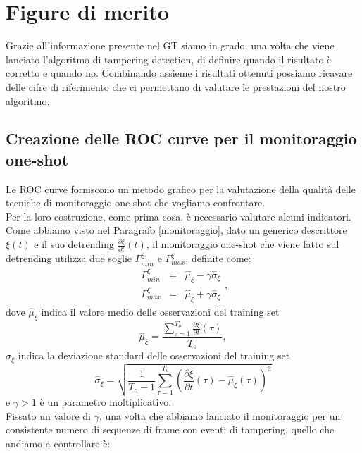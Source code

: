 \section{Figure di merito}
\label{figureDiMerito}
Grazie all'informazione presente nel GT siamo in grado, una volta che viene lanciato l'algoritmo di tampering detection, di definire quando il risultato \`e corretto e quando no.
Combinando assieme i risultati ottenuti possiamo ricavare delle cifre di riferimento che ci permettano di valutare le prestazioni del nostro algoritmo.
\subsection{Creazione delle ROC curve per il monitoraggio one-shot}
\label{metricheOneShot}
Le ROC curve forniscono un metodo grafico per la valutazione della qualit\`a delle tecniche di monitoraggio one-shot che vogliamo confrontare.\\
Per la loro costruzione, come prima cosa, \`e necessario valutare alcuni indicatori.
Come abbiamo visto nel Paragrafo \ref{monitoraggio}, dato un generico descrittore $\xi(t)$ e il suo detrending $\frac{\partial \xi}{\partial t}(t)$, il monitoraggio one-shot che viene fatto sul detrending utilizza due soglie $\Gamma_{min}^\xi$ e $\Gamma_{max}^\xi$, definite come:
\begin{equation}
	\label{eq:soglieGeneriche}
	\begin{array}{lcl}
	\Gamma_{min}^\xi & = & \widehat{\mu}_\xi -\gamma \widehat{\sigma}_\xi\\
	\Gamma_{max}^\xi & = & \widehat{\mu}_\xi + \gamma \widehat{\sigma}_\xi
	\end{array},
\end{equation}
dove $\widehat{\mu}_\xi$ indica il valore medio delle osservazioni del training set
\begin{equation}
\widehat{\mu}_\xi = \frac{\sum_{\tau = 1}^{T_{o}} \frac{\partial \xi}{\partial t}(\tau)}{T_{o}}, \nonumber
\end{equation}
$\widehat{\sigma}_\xi$ indica la deviazione standard delle osservazioni del training set
\begin{equation}
\widehat{\sigma}_\xi  = \sqrt{\frac{1}{T_{o}-1}\sum_{\tau=1}^{T_{o}}\left(\frac{\partial \xi}{\partial t}(\tau) - \widehat{\mu}_\xi(\tau)\right)^2} \nonumber
\end{equation}
e $\gamma>1$ \`e un parametro moltiplicativo.\\
Fissato un valore di $\gamma$, una volta che abbiamo lanciato il monitoraggio per un consistente numero di sequenze di frame con eventi di tampering, quello che andiamo a controllare \`e:

